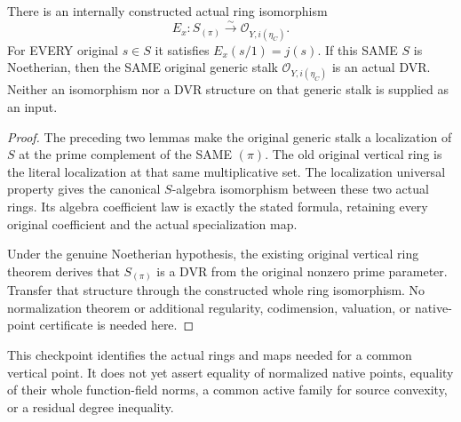 \begin{theorem}
\label{thm:gauss-common-original-component-stalk}
\leanok
There is an internally constructed actual ring isomorphism
\[
 E_x:S_{(\pi)}\xrightarrow{\sim}\mathcal O_{Y,i(\eta_C)}.
\]
For EVERY original $s\in S$ it satisfies
$E_x(s/1)=j(s)$. If this SAME $S$ is Noetherian, then the SAME original
generic stalk $\mathcal O_{Y,i(\eta_C)}$ is an actual DVR.
Neither an isomorphism nor a DVR structure on that generic stalk is
supplied as an input.
\end{theorem}
\begin{proof}
The preceding two lemmas make the original generic stalk a localization
of $S$ at the prime complement of the SAME $(\pi)$. The old original
vertical ring is the literal localization at that same multiplicative
set. The localization universal property gives the canonical
$S$-algebra isomorphism between these two actual rings. Its algebra
coefficient law is exactly the stated formula, retaining every original
coefficient and the actual specialization map.

Under the genuine Noetherian hypothesis, the existing original vertical
ring theorem derives that $S_{(\pi)}$ is a DVR from the original nonzero
prime parameter. Transfer that structure through the constructed whole
ring isomorphism. No normalization theorem or additional regularity,
codimension, valuation, or native-point certificate is needed here.
\end{proof}

This checkpoint identifies the actual rings and maps needed for a common
vertical point. It does not yet assert equality of normalized native
points, equality of their whole function-field norms, a common active
family for source convexity, or a residual degree inequality.
